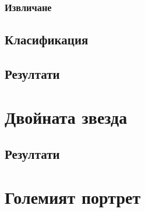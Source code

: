 \documentclass[12pt]{report}
\begin{document}
        \subsection{Извличане}
    \section{Класификация}    
    \section{Резултати}
\chapter{Двойната звезда}
    \section{Резултати}
\chapter{Големият портрет}
\end{document}
